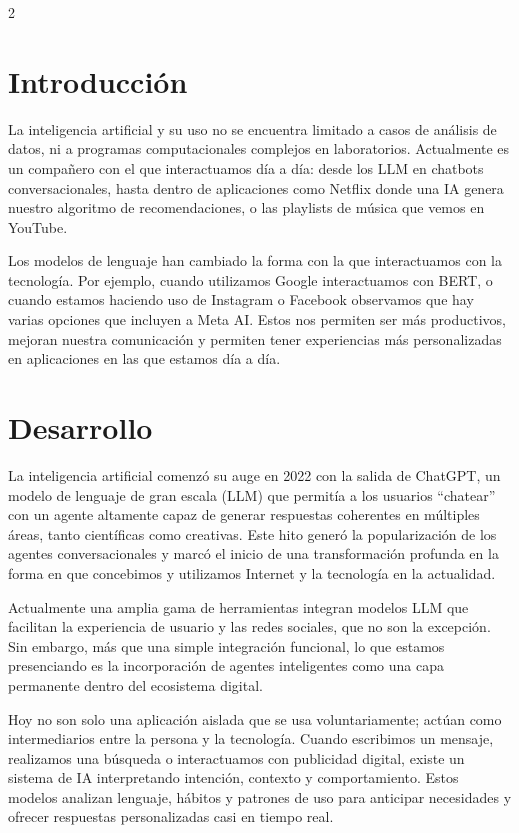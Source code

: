\documentclass[10pt,spanish,Letterpaper,openany]{book}
\begin{document}
\begin {multicols}{2}

\section{Introducción}\label{introducciuxf3n}

La inteligencia artificial y su uso no se encuentra limitado a casos de análisis de datos, ni a programas computacionales complejos en laboratorios. Actualmente es un compañero con el que interactuamos día a día: desde los LLM en chatbots conversacionales, hasta dentro de aplicaciones como Netflix donde una IA genera nuestro algoritmo de recomendaciones, o las playlists de música que vemos en YouTube.

Los modelos de lenguaje han cambiado la forma con la que interactuamos con la tecnología. Por ejemplo, cuando utilizamos Google interactuamos con BERT, o cuando estamos haciendo uso de Instagram o Facebook observamos que hay varias opciones que incluyen a Meta AI. Estos nos permiten ser más productivos, mejoran nuestra comunicación y permiten tener experiencias más personalizadas en aplicaciones en las que estamos día a día.

\section{Desarrollo}\label{desarrollo}

La inteligencia artificial comenzó su auge en 2022 con la salida de ChatGPT, un modelo de lenguaje de gran escala (LLM) que permitía a los usuarios ``chatear'' con un agente altamente capaz de generar respuestas coherentes en múltiples áreas, tanto científicas como creativas. Este hito generó la popularización de los agentes conversacionales y marcó el inicio de una transformación profunda en la forma en que concebimos y utilizamos Internet y la tecnología en la actualidad.

Actualmente una amplia gama de herramientas integran modelos LLM que facilitan la experiencia de usuario y las redes sociales, que no son la excepción. Sin embargo, más que una simple integración funcional, lo que estamos presenciando es la incorporación de agentes inteligentes como una capa permanente dentro del ecosistema digital.

Hoy no son solo una aplicación aislada que se usa voluntariamente; actúan como intermediarios entre la persona y la tecnología. Cuando escribimos un mensaje, realizamos una búsqueda o interactuamos con publicidad digital, existe un sistema de IA interpretando intención, contexto y comportamiento. Estos modelos analizan lenguaje, hábitos y patrones de uso para anticipar necesidades y ofrecer respuestas personalizadas casi en tiempo real.


\end{multicols}
\end{document}
